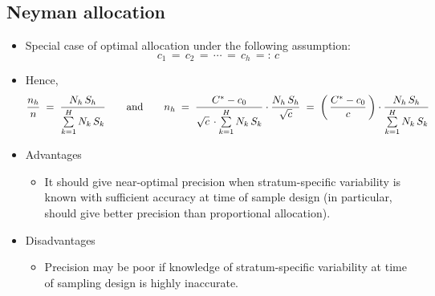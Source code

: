 

\subsection{Neyman allocation}

\begin{itemize}
\item
	Special case of optimal allocation under the following assumption:
	\begin{equation*}
	c_{1} \,=\, c_{2} \,=\, \cdots \,=\, c_{h} \, =: \, c
	\end{equation*}
\item
	Hence,
	\begin{equation*}
	\dfrac{n_{h}}{n}
	\; = \;
		\dfrac{N_{h}\,S_{h}}{\overset{H}{\underset{k=1}{\sum}}\,N_{k}\,S_{k}}
	\quad\quad
	\textnormal{and}
	\quad\quad
	n_{h}
	\; = \;
		\dfrac{C^{*} - c_{0}}{\sqrt{c}\,\cdot\overset{H}{\underset{k=1}{\sum}}\,N_{k}\,S_{k}}
		\cdot
		\dfrac{N_{h}\,S_{h}}{\sqrt{c}}
	\; = \;
		\left(\,\dfrac{C^{*} - c_{0}}{c}\,\right) \cdot \dfrac{N_{h}\,S_{h}}{\overset{H}{\underset{k=1}{\sum}}\,N_{k}\,S_{k}}
	\end{equation*}
\item
	Advantages
	\begin{itemize}
	\item
		It should give near-optimal precision when stratum-specific variability is known with
		sufficient accuracy at time of sample design (in particular, should give better precision
		than proportional allocation).
	\end{itemize}
\item
	Disadvantages
	\begin{itemize}
	\item
		Precision may be poor if knowledge of stratum-specific variability at time of sampling design
		is highly inaccurate.
	\end{itemize}
\end{itemize}

